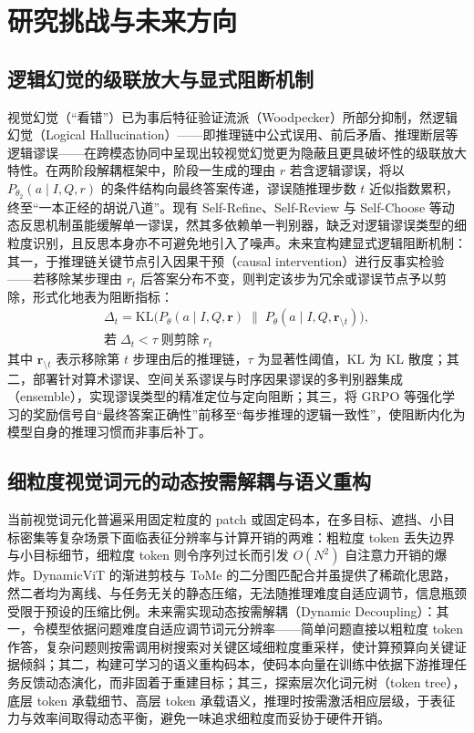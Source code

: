 \documentclass[twocolumn]{ctexart}
\begin{document}
\section{研究挑战与未来方向}\label{sec:challenge}

\subsection{逻辑幻觉的级联放大与显式阻断机制}\label{sec:ch:hallu}
视觉幻觉（“看错”）已为事后特征验证流派（Woodpecker）所部分抑制，然逻辑幻觉（Logical Hallucination）——即推理链中公式误用、前后矛盾、推理断层等逻辑谬误——在跨模态协同中呈现出较视觉幻觉更为隐蔽且更具破坏性的级联放大特性。在两阶段解耦框架中，阶段一生成的理由 $r$ 若含逻辑谬误，将以 $P_{\theta_{2}}(a\mid I,Q,r)$ 的条件结构向最终答案传递，谬误随推理步数 $t$ 近似指数累积，终至“一本正经的胡说八道”。现有 Self-Refine、Self-Review 与 Self-Choose 等动态反思机制虽能缓解单一谬误，然其多依赖单一判别器，缺乏对逻辑谬误类型的细粒度识别，且反思本身亦不可避免地引入了噪声。未来宜构建显式逻辑阻断机制：其一，于推理链关键节点引入因果干预（causal intervention）进行反事实检验——若移除某步理由 $r_{t}$ 后答案分布不变，则判定该步为冗余或谬误节点予以剪除，形式化地表为阻断指标：
\begin{multline}\label{eq:cf}
\Delta_{t}=\mathrm{KL}\!\bigl(P_{\theta}(a\mid I,Q,\mathbf{r})\;\big\|\;P_{\theta}(a\mid I,Q,\mathbf{r}_{\setminus t})\bigr), \\
\text{若}\;\Delta_{t}<\tau\;\text{则剪除}\;r_{t}
\end{multline}
其中 $\mathbf{r}_{\setminus t}$ 表示移除第 $t$ 步理由后的推理链，$\tau$ 为显著性阈值，$\mathrm{KL}$ 为 KL 散度；其二，部署针对算术谬误、空间关系谬误与时序因果谬误的多判别器集成（ensemble），实现谬误类型的精准定位与定向阻断；其三，将 GRPO 等强化学习的奖励信号自“最终答案正确性”前移至“每步推理的逻辑一致性”，使阻断内化为模型自身的推理习惯而非事后补丁。

\subsection{细粒度视觉词元的动态按需解耦与语义重构}\label{sec:ch:decouple}
当前视觉词元化普遍采用固定粒度的 patch 或固定码本，在多目标、遮挡、小目标密集等复杂场景下面临表征分辨率与计算开销的两难：粗粒度 token 丢失边界与小目标细节，细粒度 token 则令序列过长而引发 $O(N^{2})$ 自注意力开销的爆炸。DynamicViT 的渐进剪枝与 ToMe 的二分图匹配合并虽提供了稀疏化思路，然二者均为离线、与任务无关的静态压缩，无法随推理难度自适应调节，信息瓶颈受限于预设的压缩比例。未来需实现动态按需解耦（Dynamic Decoupling）：其一，令模型依据问题难度自适应调节词元分辨率——简单问题直接以粗粒度 token 作答，复杂问题则按需调用树搜索对关键区域细粒度重采样，使计算预算向关键证据倾斜；其二，构建可学习的语义重构码本，使码本向量在训练中依据下游推理任务反馈动态演化，而非固着于重建目标；其三，探索层次化词元树（token tree），底层 token 承载细节、高层 token 承载语义，推理时按需激活相应层级，于表征力与效率间取得动态平衡，避免一味追求细粒度而妥协于硬件开销。
\end{document}
